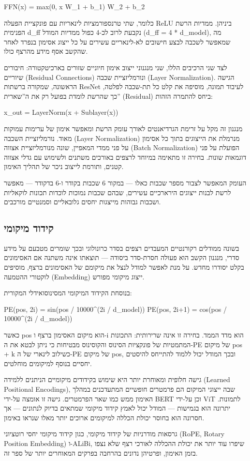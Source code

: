FFN(x) = max(0, x W\_1 + b\_1) W\_2 + b\_2

כלומר, שתי טרנספורמציות לינאריות עם פונקציית הפעלה ReLU ביניהן. ממדיות
הרשת הפנימית d\_ff נקבעת לרוב לכ-4 כפול ממדיות המודל (d\_ff = 4 *
d\_model), מה שמאפשר לשכבה לבצע חישובים לא-לינאריים עשירים על כל ייצוג
אסימון בנפרד לאחר שהקשב אסף מידע מהרצף כולו.

לצד שני הרכיבים הללו, שני מנגנוני ייצוב אימון חיוניים שזורים
בארכיטקטורה: חיבורים שיוריים (Residual Connections) ונורמליזציית שכבה
(Layer Normalization). הגישה הראשונה, שמקורה ברשתות ResNet לעיבוד תמונה,
מוסיפה את קלט כל תת-שכבה לפלטה, כך שהרשת לומדת בפועל רק את ה''שארית''
(Residual) ביחס להתמרה הזהות:

x\_out = LayerNorm(x + Sublayer(x))

מנגנון זה מקל על זרימת הגרדיאנטים לאורך עומק הרשת ומאפשר אימון של ערימות
עמוקות מאוד. נורמליזציית השכבה (Layer Normalization) מנרמלת את הייצוגים
בתוך כל אסימון על פני ממדי המאפיין, שונה מנורמליזציית אצווה (Batch
Normalization) הפועלת על פני דוגמאות שונות. בחירה זו מתאימה במיוחד
לרצפים באורכים משתנים ולשימוש עם גדלי אצווה קטנים, ותורמת לייצוב ניכר של
תהליך האימון.

העומק המאפשר לצבור מספר שכבות כאלו --- במקור 6 שכבות בקודר ו-6 בדקודר
--- מאפשר לרשת לבנות ייצוגים הירארכיים עשירים, שבהם שכבות נמוכות לוכדות
תכונות לוקאליות ושכבות גבוהות מייצגות יחסים גלובאליים וסמנטיים מורכבים.

\hypertarget{ux5e7ux5d9ux5d3ux5d5ux5d3-ux5deux5d9ux5e7ux5d5ux5deux5d9}{%
\subsection{קידוד
מיקומי}\label{ux5e7ux5d9ux5d3ux5d5ux5d3-ux5deux5d9ux5e7ux5d5ux5deux5d9}}

בשונה ממודלים רקורנטיים המעבדים רצפים בסדר כרונולוגי ובכך שומרים מטבעם
על מידע סדרי, מנגנון הקשב הוא פעולה חסרת-סדר ביסודה --- תוצאתו אינה
משתנה אם האסימונים בקלט יסודרו מחדש. על מנת לאפשר למודל לנצל את מיקומם
של האסימונים ברצף, מוסיפים לוקטורי ההטמעה (Embedding) ייצוג מיקומי
מפורש.

בנוסחת הקידוד המיקומי המסינוסואידלי המקורית:

PE(pos, 2i) = sin(pos / 10000\^{}(2i / d\_model)) PE(pos, 2i+1) =
cos(pos / 10000\^{}(2i / d\_model))

כאשר pos הוא מיקום האסימון ברצף ו-i הוא מדד הממד. בחירה זו אינה
שרירותית: התכונות המתמטיות של פונקציות הסינוס והקוסינוס מבטיחות כי ניתן
לבטא את ה-PE של מיקום pos + k כשילוב לינארי של ה-PE של מיקום pos, ובכך
המודל יכול ללמוד להתייחס להיסטים יחסיים בנוסף למיקומים מוחלטים.

גישה חלופית ומאוחרת יותר היא שימוש בקידודים מיקומיים הניתנים ללמידה
(Learned Positional Encodings), שבה ייצוגי המיקום הם פרמטרים חופשיים
המתעדכנים במהלך האימון ממש כמו שאר הפרמטרים. גישה זו אומצה על-ידי BERT
וכן על-ידי ViT לתמונות. יתרונה הוא בגמישות --- המודל יכול לאמץ קידוד
מיקומי שמתאים בדיוק לנתונים --- אך חסרונה הוא בחוסר יכולת הכללה למיקומים
ארוכים יותר מאלו שנראו באימון.

גרסאות מודרניות של קידוד מיקומי, כגון קידוד מיקומי יחסי רוטציוני (RoPE,
Rotary Position Embedding) ו-ALiBi, שיפרו עוד יותר את יכולת ההכללה
לאורכי רצף שלא נצפו בזמן האימון, ופרטיהן נדונים בהרחבה בפרקים המאוחרים
יותר של ספר זה.

